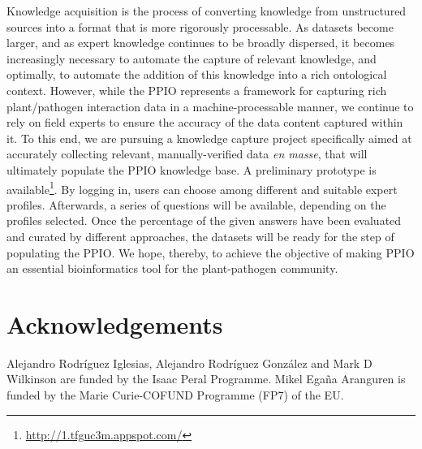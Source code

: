 \documentclass[sw]{iosart2c}
\newcommand{\myurl}[1]{\footnote{\url{#1}}}
\begin{document}
Knowledge acquisition is the process of converting knowledge from unstructured sources into a format that is more rigorously processable. As datasets become larger, and as expert knowledge continues to be broadly dispersed, it becomes increasingly necessary to automate the capture of relevant knowledge, and optimally, to automate the addition of this knowledge into a rich ontological context. However, while the PPIO represents a framework for capturing rich plant/pathogen interaction data in a machine-processable manner, we continue to rely on field experts to ensure the accuracy of the data content captured within it. To this end, we are pursuing a knowledge capture project specifically aimed at accurately collecting relevant, manually-verified data {\itshape en masse}, that will ultimately populate the PPIO knowledge base. A preliminary prototype is available\myurl{http://1.tfguc3m.appspot.com/}. By logging in, users can choose among different and suitable expert profiles. Afterwards, a series of questions will be available, depending on the profiles selected. Once the percentage of the given answers have been evaluated and curated by different approaches, the datasets will be ready for the step of populating the PPIO. We hope, thereby, to achieve the objective of making PPIO an essential bioinformatics tool for the plant-pathogen community.



\section*{Acknowledgements}
Alejandro Rodr\'iguez Iglesias, Alejandro Rodr\'iguez Gonz\'alez and Mark D Wilkinson are funded by the Isaac Peral Programme. Mikel Ega\~na Aranguren is funded by the Marie Curie-COFUND Programme (FP7) of the EU.












  
\end{document}
